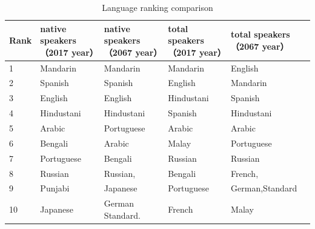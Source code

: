 \begin{table}[H]
	\centering
	\caption{Language ranking comparison}
	\begin{tabular}{l p{2.8cm}p{2.8cm}p{2.8cm}p{2.8cm}}
		\toprule
		\multicolumn{1}{l}{Rank} & native speakers（2017 year） & native speakers（2067 year） & total speakers（2017 year） & total speakers（2067 year） \\
		\midrule
		1     & Mandarin & Mandarin & Mandarin & English \\
		2     & Spanish & Spanish & English & Mandarin \\
		3     & English & English & Hindustani & Spanish \\
		4     & Hindustani & Hindustani & Spanish & Hindustani \\
		5     & Arabic & Portuguese & Arabic & Arabic \\
		6     & Bengali & Arabic & Malay & Portuguese \\
		7     & Portuguese & Bengali & Russian & Russian \\
		8     & Russian & Russian, & Bengali & French, \\
		9     & Punjabi & Japanese & Portuguese & German,Standard \\
		10    & Japanese & German Standard. & French & Malay \\
		\bottomrule
	\end{tabular}%
	\label{tab:addlabel}%
\end{table}%


